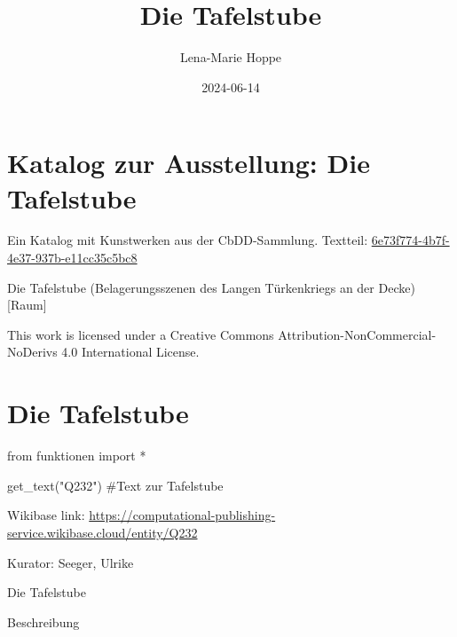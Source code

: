 \documentclass[
  a4paper,
  portrait]{book}
\title{Die Tafelstube}
\author{Lena-Marie Hoppe}
\date{2024-06-14}
\newenvironment{Shaded}{\begin{snugshade}}{\end{snugshade}}
\newcommand{\CommentTok}[1]{\textcolor[rgb]{0.37,0.37,0.37}{#1}}
\newcommand{\ImportTok}[1]{\textcolor[rgb]{0.00,0.46,0.62}{#1}}
\newcommand{\NormalTok}[1]{\textcolor[rgb]{0.00,0.23,0.31}{#1}}
\newcommand{\OperatorTok}[1]{\textcolor[rgb]{0.37,0.37,0.37}{#1}}
\newcommand{\StringTok}[1]{\textcolor[rgb]{0.13,0.47,0.30}{#1}}
\renewcommand*\contentsname{Table of contents}
\newcommand\contentsname{Table of contents}
\begin{document}
\frontmatter
\maketitle

\renewcommand*\contentsname{Table of contents}
{
\setcounter{tocdepth}{2}
\tableofcontents
}

\mainmatter
{}

\chapter{Katalog zur Ausstellung: Die
Tafelstube}\label{katalog-zur-ausstellung-die-tafelstube}

Ein Katalog mit Kunstwerken aus der CbDD-Sammlung. Textteil:
\href{https://www.deckenmalerei.eu/42d06165-58e7-4653-bfe4-3d5f7091fc33\#6e73f774-4b7f-4e37-937b-e11cc35c5bc8}{6e73f774-4b7f-4e37-937b-e11cc35c5bc8}

Die Tafelstube (Belagerungsszenen des Langen Türkenkriegs an der Decke)
{[}Raum{]}

This work is licensed under a Creative Commons
Attribution-NonCommercial-NoDerivs 4.0 International License.


\chapter{Die Tafelstube}\label{die-tafelstube}

\begin{Shaded}
\begin{Highlighting}[]
\ImportTok{from}\NormalTok{ funktionen }\ImportTok{import} \OperatorTok{*}
\end{Highlighting}
\end{Shaded}

\begin{Shaded}
\begin{Highlighting}[]
\NormalTok{get\_text(}\StringTok{"Q232"}\NormalTok{)}
\CommentTok{\#Text zur Tafelstube}
\end{Highlighting}
\end{Shaded}

Wikibase link:
\url{https://computational-publishing-service.wikibase.cloud/entity/Q232}

Kurator: Seeger, Ulrike

Die Tafelstube

Beschreibung
\end{document}

